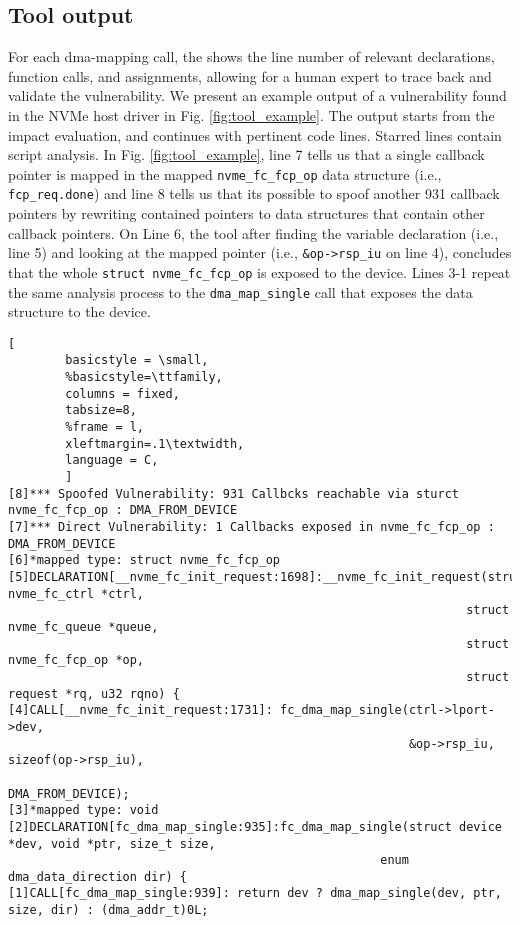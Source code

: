 \subsection{Tool output}
For each dma-mapping call, the \tool shows the line number of relevant declarations, function calls, and assignments, allowing for a human expert to trace back and validate the vulnerability. We present an example output of a vulnerability found in the NVMe host driver in Fig. \ref{fig:tool_example}.
The output starts from the impact evaluation, and continues with pertinent code lines. Starred lines contain script analysis. In Fig. \ref{fig:tool_example}, line 7 tells us that a single callback pointer is mapped in the mapped \texttt{nvme\_fc\_fcp\_op} data structure (i.e., \texttt{fcp\_req.done}) and line 8 tells us that its possible to spoof another 931 callback pointers by rewriting contained pointers to data structures that contain other callback pointers. On Line 6, the tool after finding the variable  declaration (i.e., line 5) and looking at the mapped pointer (i.e., \texttt{\&op->rsp\_iu} on line 4), concludes that the whole \texttt{struct nvme\_fc\_fcp\_op} is exposed to the device. Lines 3-1 repeat the same analysis process to the \texttt{dma\_map\_single} call that exposes the data structure to the device. 

\begin{figure*}[t]

        \begin{lstlisting}[
        basicstyle = \small,
        %basicstyle=\ttfamily,
        columns = fixed,
        tabsize=8,
        %frame = l,
        xleftmargin=.1\textwidth,
        language = C,
        ]
[8]*** Spoofed Vulnerability: 931 Callbcks reachable via sturct nvme_fc_fcp_op : DMA_FROM_DEVICE
[7]*** Direct Vulnerability: 1 Callbacks exposed in nvme_fc_fcp_op : DMA_FROM_DEVICE
[6]*mapped type: struct nvme_fc_fcp_op
[5]DECLARATION[__nvme_fc_init_request:1698]:__nvme_fc_init_request(struct nvme_fc_ctrl *ctrl,
                                                                struct nvme_fc_queue *queue, 
                                                                struct nvme_fc_fcp_op *op, 
                                                                struct request *rq, u32 rqno) {
[4]CALL[__nvme_fc_init_request:1731]: fc_dma_map_single(ctrl->lport->dev,
                                                        &op->rsp_iu, sizeof(op->rsp_iu),
                                                        DMA_FROM_DEVICE);
[3]*mapped type: void
[2]DECLARATION[fc_dma_map_single:935]:fc_dma_map_single(struct device *dev, void *ptr, size_t size, 
                                                    enum dma_data_direction dir) {
[1]CALL[fc_dma_map_single:939]: return dev ? dma_map_single(dev, ptr, size, dir) : (dma_addr_t)0L;

                \end{lstlisting}
        \caption{ Tool output example.}
        \label{fig:tool_example}

\end{figure*}
